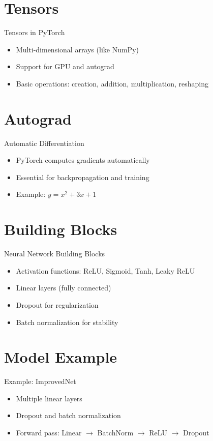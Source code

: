 \documentclass{beamer}
\begin{document}
\section{Tensors}
\begin{frame}{Tensors in PyTorch}
  \begin{itemize}
    \item Multi-dimensional arrays (like NumPy)
    \item Support for GPU and autograd
    \item Basic operations: creation, addition, multiplication, reshaping
  \end{itemize}
\end{frame}

\section{Autograd}
\begin{frame}{Automatic Differentiation}
  \begin{itemize}
    \item PyTorch computes gradients automatically
    \item Essential for backpropagation and training
    \item Example: $y = x^2 + 3x + 1$
  \end{itemize}
\end{frame}

\section{Building Blocks}
\begin{frame}{Neural Network Building Blocks}
  \begin{itemize}
    \item Activation functions: ReLU, Sigmoid, Tanh, Leaky ReLU
    \item Linear layers (fully connected)
    \item Dropout for regularization
    \item Batch normalization for stability
  \end{itemize}
\end{frame}

\section{Model Example}
\begin{frame}{Example: ImprovedNet}
  \begin{itemize}
    \item Multiple linear layers
    \item Dropout and batch normalization
    \item Forward pass: Linear $\rightarrow$ BatchNorm $\rightarrow$ ReLU $\rightarrow$ Dropout
  \end{itemize}
\end{frame}
\end{document}
